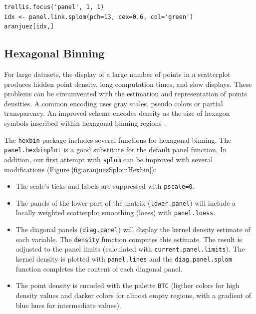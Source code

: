 \documentclass[smallroyalvopaper]{memoir}
\begin{document}

\lstset{language=r,label= ,caption= ,captionpos=b,numbers=none}
\begin{lstlisting}
trellis.focus('panel', 1, 1)
idx <- panel.link.splom(pch=13, cex=0.6, col='green')
aranjuez[idx,]
\end{lstlisting}


\subsection{Hexagonal Binning \label{SEC:hexbin}}
\label{sec:orgbb598f3}

For large datasets, the display of a large number of points in a
scatterplot produces hidden point density, long computation times,
and slow displays. These problems can be circumvented with the
estimation and representation of points densities.  A common
encoding uses gray scales, pseudo colors or partial
transparency. An improved scheme encodes density as the size of
hexagon symbols inscribed within hexagonal binning regions
\cite{Carr.Littlefield.ea1987}.

The \texttt{hexbin} package \cite{Carr.Lewin-Koh.ea2013} includes several
functions for hexagonal binning.  The \texttt{panel.hexbinplot} is a good
substitute for the default panel function. In addition, our first
attempt with \texttt{splom} can be improved with several modifications
(Figure \ref{fig:aranjuezSplomHexbin}):
\begin{itemize}
\item The scale's ticks and labels are suppressed with \texttt{pscale=0}.
\item The panels of the lower part of the matrix (\texttt{lower.panel}) will
include a locally weighted scatterplot smoothing (loess) with
\texttt{panel.loess}.
\item The diagonal panels (\texttt{diag.panel}) will display the kernel
density estimate of each variable. The \texttt{density} function
computes this estimate. The result is adjusted to the panel
limits (calculated with \texttt{current.panel.limits}). The kernel
density is plotted with \texttt{panel.lines} and the \texttt{diag.panel.splom}
function completes the content of each diagonal panel.
\item The point density is encoded with the palette \texttt{BTC} (ligther
colors for high density values and darker colors for almost
empty regions, with a gradient of blue hues for intermediate values).
\end{itemize}
\end{document}
